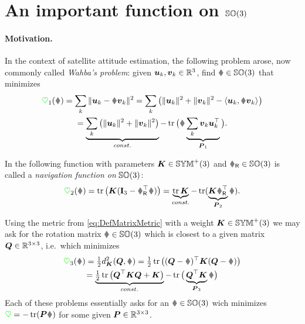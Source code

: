\section{An important function on $\mathbb{SO}(3)$}\label{sec:AppendixAttitudePotential}
\paragraph{Motivation.}
In the context of satellite attitude estimation, the following problem \cite{Wahba:WahbaProblem} arose, now commonly called \textit{Wahba's problem}: given $\boldsymbol{u}_k, \boldsymbol{v}_k \in \mathbb{R}^3$, find $\R \in \SpecialOrthogonalGroup(3)$ that minimizes
\begin{multline}
 \potentialEnergy_1(\R) = \sum_k \norm{\tuple{u}_k - \R \tuple{v}_k}^2
 = \sum_k \big( \norm{\tuple{u}_k}^2 + \norm{\tuple{v}_k}^2 - \sProd{\tuple{u}_k}{\R \tuple{v}_k} \big)
\\
 = \underbrace{\sum_k \big( \norm{\tuple{u}_k}^2 + \norm{\tuple{v}_k}^2 \big)}_{\const} - \tr\big( \R \underbrace{\sum_k \tuple{v}_k \tuple{u}_k^\top}_{\mat{P}_1} \big).
\end{multline}

In \cite{Koditschek:TotalEnergy} the following function with parameters $\boldsymbol{K}\in\mathbb{SYM}^{+}(3)$ and $\RR\in\SpecialOrthogonalGroup(3)$ is called a \textit{navigation function on} $\mathbb{SO}(3)$:
\begin{align}
 \potentialEnergy_2(\R) = \tr\big(\mat{K}(\idMat[3] - \RR^\top\R)\big) = \underbrace{\tr\mat{K}}_{\const} - \tr(\underbrace{\mat{K}\RR^\top}_{\mat{P}_2}\R).
\end{align}

Using the metric from \eqref{eq:DefMatrixMetric} with a weight $\boldsymbol{K}\in\mathbb{SYM}^{+}(3)$ we may ask for the rotation matrix $\R \in \SpecialOrthogonalGroup(3)$ which is closest to a given matrix $\boldsymbol{Q}\in\mathbb{R}^{3\times3}$, i.e.\ which minimizes
\begin{multline}
 \potentialEnergy_3(\R) = \tfrac{1}{2} \metricSq[\mat{K}]{\mat{Q}}{\R} 
 = \tfrac{1}{2} \tr\big( (\mat{Q}-\R)^\top \mat{K} (\mat{Q}-\R) \big)
\\
 = \underbrace{\tfrac{1}{2} \tr\big( \mat{Q}^\top \mat{K} \mat{Q} + \mat{K} \big)}_{\const} - \tr\big( \underbrace{\mat{Q}^\top \mat{K}}_{\mat{P}_3} \R \big)
\end{multline}
Each of these problems essentially asks for an $\R\in\SpecialOrthogonalGroup(3)$ wich minimizes $\potentialEnergy = -\tr(\mat{P} \R)$ for some given $\boldsymbol{P}\in\mathbb{R}^{3\times3}$.

